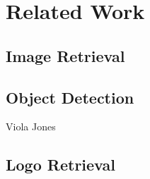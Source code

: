 \chapter{Related Work}

\section{Image Retrieval}

\section{Object Detection}
Viola Jones

\section{Logo Retrieval}
